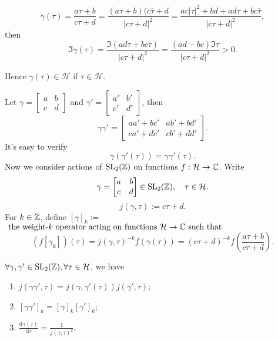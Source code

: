 \[
\gamma(\tau)= \frac{a\tau+b}{c\tau+d}=\frac{(a\tau+b)(c \overline{\tau}+d}{|c\tau+d|^2}=\frac{ac|\tau|^2+bd+ad\tau+bc \overline{\tau}}{|c\tau+d|^2},
\]
then
\[
  \Im \gamma(\tau)= \frac{\Im(ad\tau+bc \overline{\tau})}{|c\tau+d|^2}= \frac{(ad-bc)\Im\tau}{|c\tau+d|^2}>0.
\]

Hence $\gamma(\tau)\in \mathcal{H}$ if $\tau \in \mathcal{H}$.


Let $\gamma =\begin{bmatrix} a&b\\c&d \end{bmatrix} $ and $\gamma'=\begin{bmatrix} a'&b'\\c'&d' \end{bmatrix} $, then
\[
  \gamma\gamma'=\begin{bmatrix} aa'+bc'&ab'+bd'\\ca'+dc'&c b'+d d' \end{bmatrix} .
\] 
It's easy to verify 
\[
  \gamma(\gamma'(\tau))=\gamma\gamma'(\tau).
\]
Now we consider actions of $\operatorname{SL}_2(\mathbb{Z})$ on functions $f: \mathcal{H}\to \mathbb{C}$. Write \[
  \gamma =\begin{bmatrix} a&b\\c&d \end{bmatrix} \in \operatorname{SL}_2(\mathbb{Z}) ,\quad \tau \in \mathcal{H}.
\] 
\[
  j(\gamma,\tau):=c\tau+d.
\] 
For $k\in \mathbb{Z}$, define $[\gamma]_k:=$ $\text{ the weight-}k \text{ operator acting on functions } \mathcal{H}\to \mathbb{C} \text{ such that }$
\[
  \left( f[\gamma_k] \right)(\tau)=j(\gamma,\tau)^{-k}f(\gamma(\tau))=(c\tau+d)^{-k}f\left( \frac{a\tau+b}{c\tau+d} \right) . 
\]
\begin{lemma}
   $\forall \gamma,\gamma' \in \operatorname{SL}_2(\mathbb{Z}), \forall \tau \in \mathcal{H}$, we have 
   \begin{enumerate}
     \item $j(\gamma\gamma',\tau)=j(\gamma,\gamma'(\tau))j(\gamma',\tau)$;
     \item $[\gamma\gamma']_k=[\gamma]_k[\gamma']_k$;
     \item  $\frac{\mathrm{d}\gamma(\tau)}{\mathrm{d}\tau}=\frac{1}{j(\gamma,\tau)^2}$.
   \end{enumerate}
\end{lemma}

